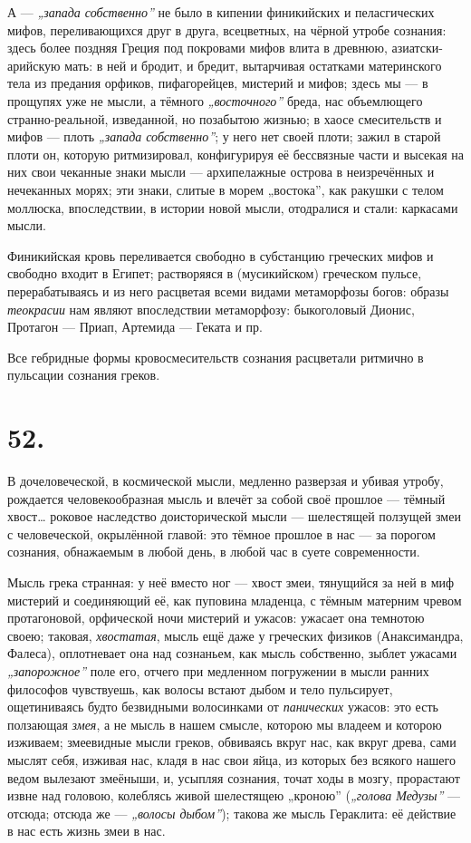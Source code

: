 \documentclass[12pt,a4paper,oneside]{book}
\begin{document}
А — \emph{„запада собственно”} не было в кипении финикийских и пеласгических мифов, переливающихся друг в друга, всецветных, на чёрной утробе сознания: здесь более поздняя Греция под покровами мифов влита в древнюю, азиатски-арийскую мать: в ней и бродит, и бредит, вытарчивая остатками материнского тела из предания орфиков, пифагорейцев, мистерий и мифов; здесь мы — в прощупях уже не мысли, а тёмного \emph{„восточного”} бреда, нас объемлющего странно-реальной, изведанной, но позабытою жизнью; в хаосе смесительств и мифов — плоть \emph{„запада собственно”}; у него нет своей плоти; зажил в старой плоти он, которую ритмизировал, конфигурируя её бессвязные части и высекая на них свои чеканные знаки мысли — архипелажные острова в неизречённых и нечеканных морях; эти знаки, слитые в морем „востока”, как ракушки с телом моллюска, впоследствии, в истории новой мысли, отодралися и стали: каркасами мысли.

Финикийская кровь переливается свободно в субстанцию греческих мифов и свободно входит в Египет; растворяяся в (мусикийском) греческом пульсе, перерабатываясь и из него расцветая всеми видами метаморфозы богов: образы \emph{теокрасии} нам являют впоследствии метаморфозу: быкоголовый Дионис, Протагон — Приап, Артемида — Геката и пр.

Все гебридные формы кровосмесительств сознания расцветали ритмично в пульсации сознания греков.

\section*{52.}

В дочеловеческой, в космической мысли, медленно разверзая и убивая утробу, рождается человекообразная мысль и влечёт за собой своё прошлое — тёмный хвост… роковое наследство доисторической мысли — шелестящей ползущей змеи с человеческой, окрылённой главой: это тёмное прошлое в нас — за порогом сознания, обнажаемым в любой день, в любой час в суете современности.

Мысль грека странная: у неё вместо ног — хвост змеи, тянущийся за ней в миф мистерий и соединяющий её, как пуповина младенца, с тёмным матерним чревом протагоновой, орфической ночи мистерий и ужасов: ужасает она темнотою своею; таковая, \emph{хвостатая}, мысль ещё даже у греческих физиков (Анаксимандра, Фалеса), оплотневает она над сознаньем, как мысль собственно, зыблет ужасами \emph{„запорожное”} поле его, отчего при медленном погружении в мысли ранних философов чувствуешь, как волосы встают дыбом и тело пульсирует, ощетиниваясь будто безвидными волосинками от \emph{панических} ужасов: это есть ползающая \emph{змея}, а не мысль в нашем смысле, которою мы владеем и которою изживаем; змеевидные мысли греков, обвиваясь вкруг нас, как вкруг древа, сами мыслят себя, изживая нас, кладя в нас свои яйца, из которых без всякого нашего ведом вылезают змеёныши, и, усыпляя сознания, точат ходы в мозгу, прорастают извне над головою, колеблясь живой шелестящею „кроною” (\emph{„голова Медузы”} — отсюда; отсюда же — \emph{„волосы дыбом”}); такова же мысль Гераклита: её действие в нас есть жизнь змеи в нас.
\end{document}
